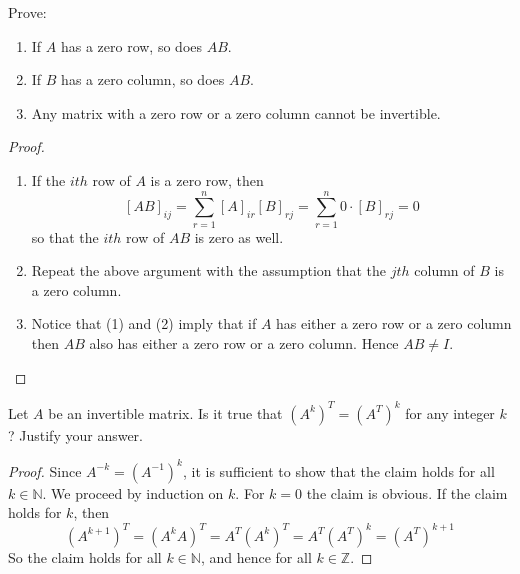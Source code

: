 \begin{problem} \label{P.1.15}
    Prove:
    \begin{enumerate}
        \item If \( A \) has a zero row, so does \( AB \).
        
        \item If \( B \) has a zero column, so does \( AB \).
        
        \item Any matrix with a zero row or a zero column cannot be invertible.
    \end{enumerate}
    
    \begin{proof}
        \begin{enumerate}
            \item If the \( ith \) row of \( A \) is a zero row, then
            \[
            [AB]_{ij} = \sum_{r=1}^n[A]_{ir}[B]_{rj} = \sum_{r=1}^n 0 \cdot [B]_{rj} = 0
            \]
            so that the \( ith \) row of \( AB \) is zero as well.
            
            \item Repeat the above argument with the assumption that the \( jth \) column of \( B \) is a zero column.
            
            \item Notice that (1) and (2) imply that if \( A \) has either a zero row or a zero column then \( AB \) also has either a zero row or a zero column. Hence \( AB \neq I \).
        \end{enumerate}
    \end{proof}
\end{problem}

\begin{problem} \label{P.1.16}
    Let \( A \) be an invertible matrix. Is it true that \( (A^k)^T = (A^T)^k \) for any integer \( k \)? Justify your answer.
    
    \begin{proof}
        Since \( A^{-k} = (A^{-1})^k \), it is sufficient to show that the claim holds for all \( k \in \mathbb{N} \). We proceed by induction on \( k \). For \( k = 0 \) the claim is obvious. If the claim holds for \( k \), then
        \[ (A^{k+1})^T = (A^kA)^T = A^T(A^k)^T = A^T(A^T)^k = (A^T)^{k+1} \]
        So the claim holds for all \( k \in \mathbb{N} \), and hence for all \( k \in \mathbb{Z} \).
    \end{proof}
\end{problem}

